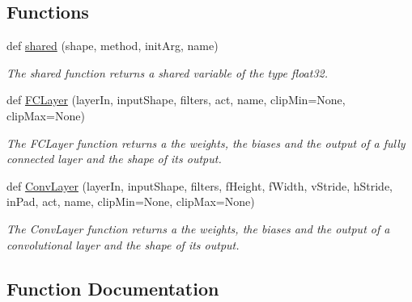 \subsection*{Functions}
\begin{DoxyCompactItemize}
\item 
def \hyperlink{namespaceDQN-Deepmind-NIPS-2013_1_1dqn_1_1ConvNet_afb9c5707e3aa3d00b7b1d7158618ffe3}{shared} (shape, method, init\+Arg, name)
\begin{DoxyCompactList}\small\item\em The shared function returns a shared variable of the type float32. \end{DoxyCompactList}\item 
def \hyperlink{namespaceDQN-Deepmind-NIPS-2013_1_1dqn_1_1ConvNet_a45a4079e9e7d0d95c8e1de160f76145d}{F\+C\+Layer} (layer\+In, input\+Shape, filters, act, name, clip\+Min=None, clip\+Max=None)
\begin{DoxyCompactList}\small\item\em The F\+C\+Layer function returns a the weights, the biases and the output of a fully connected layer and the shape of its output. \end{DoxyCompactList}\item 
def \hyperlink{namespaceDQN-Deepmind-NIPS-2013_1_1dqn_1_1ConvNet_a23d5e8c8b82d7eb3e282d83e650fea38}{Conv\+Layer} (layer\+In, input\+Shape, filters, f\+Height, f\+Width, v\+Stride, h\+Stride, in\+Pad, act, name, clip\+Min=None, clip\+Max=None)
\begin{DoxyCompactList}\small\item\em The Conv\+Layer function returns a the weights, the biases and the output of a convolutional layer and the shape of its output. \end{DoxyCompactList}\end{DoxyCompactItemize}


\subsection{Function Documentation}
\hypertarget{namespaceDQN-Deepmind-NIPS-2013_1_1dqn_1_1ConvNet_a23d5e8c8b82d7eb3e282d83e650fea38}{}\label{namespaceDQN-Deepmind-NIPS-2013_1_1dqn_1_1ConvNet_a23d5e8c8b82d7eb3e282d83e650fea38} 
